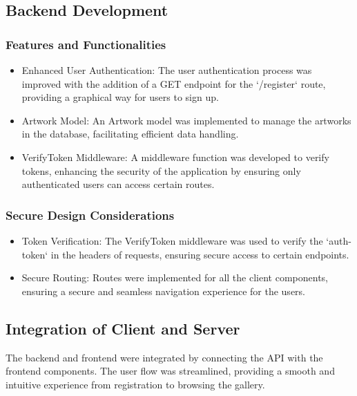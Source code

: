 \documentclass[11pt]{article}
\begin{document}
\subsection{Backend Development}
\label{sec:org52f390f}

\subsubsection{Features and Functionalities}
\label{sec:org5bbbd7e}
\begin{itemize}
\item Enhanced User Authentication: The user authentication process was improved
with the addition of a GET endpoint for the `/register` route, providing a
graphical way for users to sign up.
\item Artwork Model: An Artwork model was implemented to manage the artworks in
the database, facilitating efficient data handling.
\item VerifyToken Middleware: A middleware function was developed to verify
tokens, enhancing the security of the application by ensuring only
authenticated users can access certain routes.
\end{itemize}

\subsubsection{Secure Design Considerations}
\label{sec:org0f08f16}
\begin{itemize}
\item Token Verification: The VerifyToken middleware was used to verify the
`auth-token` in the headers of requests, ensuring secure access to certain
endpoints.
\item Secure Routing: Routes were implemented for all the client components,
ensuring a secure and seamless navigation experience for the users.
\end{itemize}

\subsection{Integration of Client and Server}
\label{sec:org8b15fa1}
The backend and frontend were integrated by connecting the API with the frontend
components. The user flow was streamlined, providing a smooth and intuitive
experience from registration to browsing the gallery. 
\end{document}
